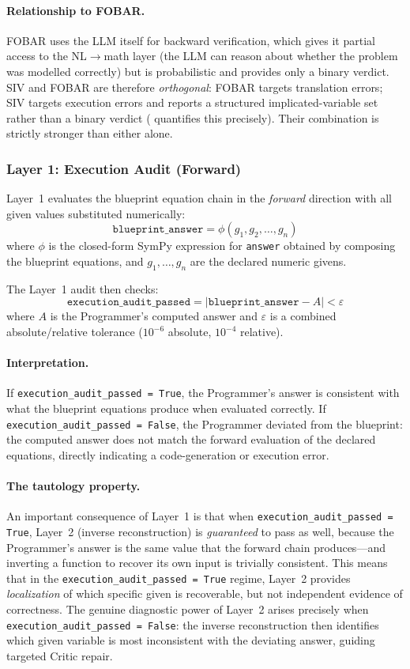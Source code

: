 \documentclass[11pt,a4paper]{article}
\begin{document}
\paragraph{Relationship to FOBAR.}
FOBAR \citep{jiang2024fobar} uses the LLM itself for backward verification, which gives it partial access to the NL$\to$math layer (the LLM can reason about whether the problem was modelled correctly) but is probabilistic and provides only a binary verdict.
SIV and FOBAR are therefore \emph{orthogonal}: FOBAR targets translation errors; SIV targets execution errors and reports a structured implicated-variable set rather than a binary verdict ( quantifies this precisely).
Their combination is strictly stronger than either alone.

\subsubsection{Layer 1: Execution Audit (Forward)}

Layer~1 evaluates the blueprint equation chain in the \emph{forward} direction with all given values substituted numerically:
\[
  \texttt{blueprint\_answer} = \phi(g_1, g_2, \ldots, g_n)
\]
where $\phi$ is the closed-form SymPy expression for \texttt{answer} obtained by composing the blueprint equations, and $g_1,\ldots,g_n$ are the declared numeric givens.

The Layer~1 audit then checks:
\[
  \texttt{execution\_audit\_passed} = \left|\texttt{blueprint\_answer} - A\right| < \varepsilon
\]
where $A$ is the Programmer's computed answer and $\varepsilon$ is a combined absolute/relative tolerance ($10^{-6}$ absolute, $10^{-4}$ relative).

\paragraph{Interpretation.}
If \texttt{execution\_audit\_passed = True}, the Programmer's answer is consistent with what the blueprint equations produce when evaluated correctly.
If \texttt{execution\_audit\_passed = False}, the Programmer deviated from the blueprint: the computed answer does not match the forward evaluation of the declared equations, directly indicating a code-generation or execution error.

\paragraph{The tautology property.}
An important consequence of Layer~1 is that when \texttt{execution\_audit\_passed = True}, Layer~2 (inverse reconstruction) is \emph{guaranteed} to pass as well, because the Programmer's answer is the same value that the forward chain produces---and inverting a function to recover its own input is trivially consistent.
This means that in the \texttt{execution\_audit\_passed = True} regime, Layer~2 provides \emph{localization} of which specific given is recoverable, but not independent evidence of correctness.
The genuine diagnostic power of Layer~2 arises precisely when \texttt{execution\_audit\_passed = False}: the inverse reconstruction then identifies which given variable is most inconsistent with the deviating answer, guiding targeted Critic repair.
\end{document}
